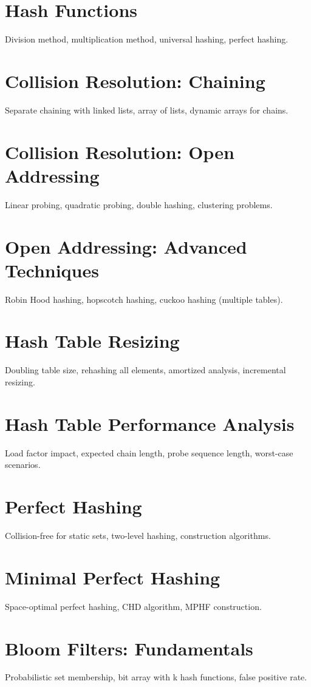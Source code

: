 \chapter{Hash Functions}
Division method, multiplication method, universal hashing, perfect hashing.

\chapter{Collision Resolution: Chaining}
Separate chaining with linked lists, array of lists, dynamic arrays for chains.

\chapter{Collision Resolution: Open Addressing}
Linear probing, quadratic probing, double hashing, clustering problems.

\chapter{Open Addressing: Advanced Techniques}
Robin Hood hashing, hopscotch hashing, cuckoo hashing (multiple tables).

\chapter{Hash Table Resizing}
Doubling table size, rehashing all elements, amortized analysis, incremental resizing.

\chapter{Hash Table Performance Analysis}
Load factor impact, expected chain length, probe sequence length, worst-case scenarios.

\chapter{Perfect Hashing}
Collision-free for static sets, two-level hashing, construction algorithms.

\chapter{Minimal Perfect Hashing}
Space-optimal perfect hashing, CHD algorithm, MPHF construction.

\chapter{Bloom Filters: Fundamentals}
Probabilistic set membership, bit array with k hash functions, false positive rate.

